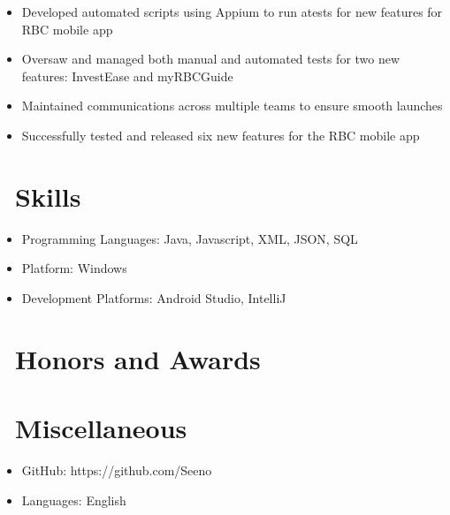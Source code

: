 \documentclass{resume}
\begin{document}
\begin{itemize}
  \item Developed automated scripts using Appium to run atests for new features for RBC mobile app
  \item Oversaw and managed both manual and automated tests for two new features: InvestEase and myRBCGuide
  \item Maintained communications across multiple teams to ensure smooth launches
  \item Successfully tested and released six new features for the RBC mobile app
\end{itemize}



\section{\faCogs\ Skills}
\begin{itemize}[parsep=0.5ex]
  \item Programming Languages: Java, Javascript, XML, JSON, SQL
  \item Platform: Windows
  \item Development Platforms: Android Studio, IntelliJ
\end{itemize}

\section{\faHeartO\ Honors and Awards}


\section{\faInfo\ Miscellaneous}
\begin{itemize}[parsep=0.5ex]
  \item GitHub: {\color{blue}https://github.com/Seeno}
  \item Languages: English
\end{itemize}

%
%
\end{document}
